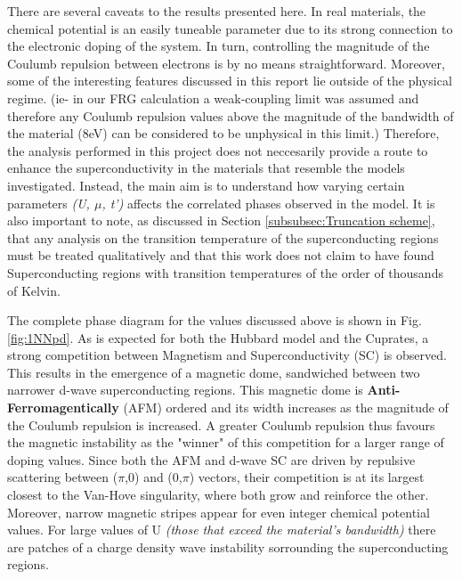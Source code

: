 \documentclass[12pt]{article}
\begin{document}
\noindent There are several caveats to the results presented here. In real materials,  the chemical potential is an easily tuneable parameter due to its strong connection to the electronic doping of the system.
In turn, controlling the magnitude of the Coulumb repulsion between electrons is by no means straightforward. 
Moreover, some of the interesting features discussed in this report lie outside of the physical regime. (ie- in our FRG calculation a weak-coupling limit was 
assumed and therefore any Coulumb repulsion values above the magnitude of the  bandwidth of the material (8eV) can be considered to be unphysical in this limit.)
Therefore, the analysis performed in this project does not neccesarily provide a route to enhance the superconductivity in the materials that resemble the models investigated.
Instead, the main aim is to understand how varying certain parameters \textit{(U, $\mu$, t')} affects the correlated phases observed in the model. It is also important to note, as discussed in Section \ref{subsubsec:Truncation scheme}, that any analysis on the transition temperature
of the superconducting regions must be treated qualitatively and that this work does not claim to have found Superconducting regions with transition temperatures of the order of thousands of Kelvin. \par 

\medskip
\noindent The complete phase diagram for the values discussed above is shown in Fig.\ref{fig:1NNpd}. As is expected
for both the Hubbard model and the Cuprates\cite{kivelson1998electronic,fradkin2015colloquium,vanhala2018dynamical}, a strong competition between Magnetism and 
Superconductivity (SC) is observed. This results in the emergence of a magnetic dome, sandwiched between two narrower d-wave superconducting regions. This magnetic dome is 
\textbf{Anti-Ferromagentically} (AFM) ordered and its width increases as the magnitude of the Coulumb repulsion is increased. A greater Coulumb repulsion thus favours the magnetic instability as the "winner" of this competition for a larger range
of doping values. Since both the AFM and d-wave SC are driven by repulsive scattering between
($\pi$,0) and (0,$\pi$) vectors, their competition is at its largest closest to the Van-Hove singularity, where both grow and reinforce the other\cite{furukawa1998truncation,honerkamp2001temperature}. Moreover, narrow magnetic stripes appear for even
integer chemical potential values. For large values of U \textit{(those that exceed the material's bandwidth)} there are patches of a charge density wave instability sorrounding the superconducting regions.\par
\end{document}
